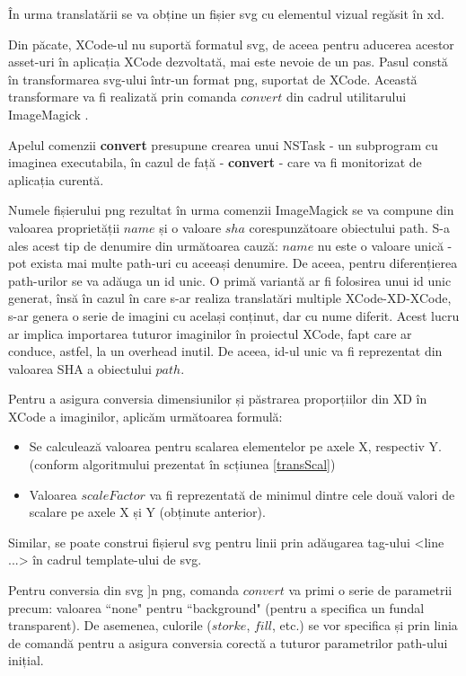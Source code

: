În urma translatării se va obține un fișier svg cu elementul vizual regăsit în xd. 

Din păcate, XCode-ul nu suportă formatul svg, de aceea pentru aducerea acestor asset-uri în aplicația XCode dezvoltată, mai este nevoie de un pas. Pasul constă în transformarea svg-ului într-un format png, suportat de XCode. Această transformare va fi realizată prin comanda $convert$ din cadrul utilitarului ImageMagick \cite{imageMagick}. 

Apelul comenzii \textbf{convert} presupune crearea unui NSTask - un subprogram cu imaginea executabila, în cazul de față - \textbf{convert} - care va fi monitorizat de aplicația curentă. 

Numele fișierului png rezultat în urma comenzii ImageMagick se va compune din valoarea proprietății $name$ și o valoare $sha$ corespunzătoare obiectului path. S-a ales acest tip de denumire din următoarea cauză: $name$ nu este o valoare unică - pot exista mai multe path-uri cu aceeași denumire. De aceea, pentru diferențierea path-urilor se va adăuga un id unic. O primă variantă ar fi folosirea unui id unic generat, însă în cazul în care s-ar realiza translatări multiple XCode-XD-XCode, s-ar genera o serie de imagini cu același conținut, dar cu nume diferit. Acest lucru ar implica importarea tuturor imaginilor în proiectul XCode, fapt care ar conduce, astfel, la un overhead inutil. De aceea, id-ul unic va fi reprezentat din valoarea SHA a obiectului $path$.

Pentru a asigura conversia dimensiunilor și păstrarea proporțiilor din XD în XCode a imaginilor, aplicăm următoarea formulă:

\begin{itemize}  
\item Se calculează valoarea pentru scalarea elementelor pe axele X, respectiv Y. (conform algoritmului prezentat în scțiunea \ref{transScal})
\item Valoarea $scaleFactor$ va fi reprezentată de minimul dintre cele două valori de scalare pe axele X și Y (obținute anterior).
\end{itemize}

Similar, se poate construi fișierul svg pentru linii prin adăugarea tag-ului <line ...> în cadrul template-ului de svg.

Pentru conversia din svg ]n png, comanda $convert$ va primi o serie de parametrii precum: valoarea ``none" pentru ``background" (pentru a specifica un fundal transparent). De asemenea, culorile ($storke$, $fill$, etc.) se vor specifica și prin linia de comandă pentru a asigura conversia corectă a tuturor parametrilor path-ului inițial.


